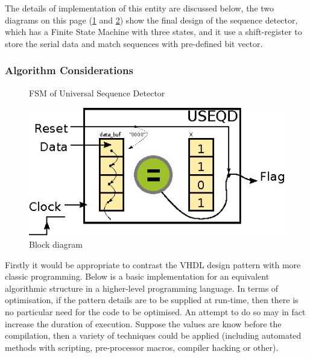 \documentclass[10pt,a4paper]{report}
\begin{document}
 The details of implementation of this entity
 are discussed below, the two diagrams on this
 page (\ref{fsm:usd} and \ref{block:usd}) show
 the final design of the sequence detector,
 which has a Finite State Machine with three
 states, and it use a shift-register to store
 the serial data and match sequences with
 pre-defined bit vector.

\subsubsection{Algorithm Considerations}

 \begin{figure}
 \caption{FSM of Universal Sequence Detector} \label{fsm:usd}
 \vspace*{0.5cm}
 \end{figure}

\begin{figure}
\center
\includegraphics[scale=1.75,angle=0]{graphs/seq_1101.eps}
\caption{\small{Block diagram}} \label{block:usd}
\end{figure}

 Firstly it would be appropriate to contrast the
 VHDL design pattern with more classic programming.
 Below is a basic implementation for an equivalent
 algorithmic structure in a higher-level programming
 language. In terms of optimisation, if the pattern
 details are to be supplied at run-time, then there
 is no particular need for the code to be optimised.
 An attempt to do so may in fact increase the duration
 of execution. Suppose the values are know before the
 compilation, then a variety of techniques could be
 applied (including automated methods with scripting,
 pre-processor macros, compiler hacking or other).
\end{document}

